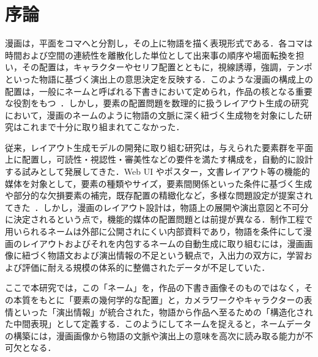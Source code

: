 \documentclass[a4j,12pt,dvipdfmx]{jsreport}
\begin{document}
\ifdefined\ismain\else
   \pagestyle{fancy}
   \lhead{\rightmark}
   \renewcommand{\chaptermark}[1]{\markboth{第\ \thechapter\ 章\ #1}{}}
   \setlength{\headheight}{16.5pt}
   \titleformat{\chapter}[hang]{\LARGE\bfseries}{\prechaptername\thechapter\postchaptername}{1em}{}
\fi


\chapter{序論}\label{chap:introduction}

漫画は，平面をコマへと分割し，その上に物語を描く表現形式である．各コマは時間および空間の連続性を離散化した単位として出来事の順序や場面転換を担い，その配置は，キャラクターやセリフ配置とともに，視線誘導，強調，テンポといった物語に基づく演出上の意思決定を反映する．このような漫画の構成上の配置は，一般にネームと呼ばれる下書きにおいて定められ，作品の核となる重要な役割をもつ~\cite{fukaya_mangalayout}．しかし，要素の配置問題を数理的に扱うレイアウト生成の研究において，漫画のネームのように物語の文脈に深く紐づく生成物を対象にした研究はこれまで十分に取り組まれてこなかった．

従来，レイアウト生成モデルの開発に取り組む研究は，与えられた要素群を平面上に配置し，可読性・視認性・審美性などの要件を満たす構成を，自動的に設計する試みとして発展してきた．Web UI やポスター，文書レイアウト等の機能的媒体を対象として，要素の種類やサイズ，要素間関係といった条件に基づく生成や部分的な欠損要素の補完，既存配置の精緻化など，多様な問題設定が提案されてきた~\cite{tanaka_scipostlayout_2024, seol_posterllama_2024, guo_vinci_2021, kikuchi_modeling_2021, deka_rico_2017, zhong_publaynet_2019}．しかし，漫画のレイアウト設計は，物語上の展開や演出意図と不可分に決定されるという点で，機能的媒体の配置問題とは前提が異なる．制作工程で用いられるネームは外部に公開されにくい内部資料であり，物語を条件にして漫画のレイアウトおよびそれを内包するネームの自動生成に取り組むには，漫画画像に紐づく物語文および演出情報の不足という観点で，入出力の双方に，学習および評価に耐える規模の体系的に整備されたデータが不足していた．

ここで本研究では，この「ネーム」を，作品の下書き画像そのものではなく，その本質をもとに「要素の幾何学的な配置」と，カメラワークやキャラクターの表情といった「演出情報」が統合された，物語から作品へ至るための「構造化された中間表現」として定義する．このようにしてネームを捉えると，ネームデータの構築には，漫画画像から物語の文脈や演出上の意味を高次に読み取る能力が不可欠となる．
\end{document}
